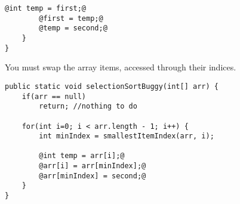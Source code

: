 \begin{questions}
\begin{solution}
\begin{lstlisting}[style=buggy]
		@int temp = first;@
		@first = temp;@
		@temp = second;@
	}
}
\end{lstlisting}	
	
You must swap the array items, accessed through their indices.	

\begin{lstlisting}[style=correct]
public static void selectionSortBuggy(int[] arr) {
	if(arr == null)
		return; //nothing to do
		
	for(int i=0; i < arr.length - 1; i++) {
		int minIndex = smallestItemIndex(arr, i);
		
		@int temp = arr[i];@
		@arr[i] = arr[minIndex];@
		@arr[minIndex] = second;@
	}
}
\end{lstlisting}
\end{solution}

%
%
%
%
%
%		
%
%
%	
%
%
%


\end{questions}
